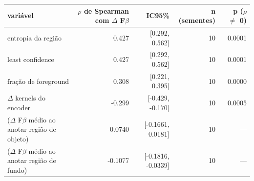 \begin{tabular}{lrrrr}
\hline
variável & $\rho$ de Spearman com $\Delta$ F$\beta$ & IC95\% & n (sementes) & p ($\rho$ $\neq$ 0) \\
\hline
entropia da região & 0.427 & [0.292, 0.562] & 10 & 0.0001 \\
least confidence & 0.427 & [0.292, 0.562] & 10 & 0.0001 \\
fração de foreground & 0.308 & [0.221, 0.395] & 10 & 0.0000 \\
$\Delta$ kernels do encoder & -0.299 & [-0.429, -0.170] & 10 & 0.0005 \\
($\Delta$ F$\beta$ médio ao anotar região de objeto) & -0.0740 & [-0.1661, 0.0181] & 10 & --- \\
($\Delta$ F$\beta$ médio ao anotar região de fundo) & -0.1077 & [-0.1816, -0.0339] & 10 & --- \\
\hline
\end{tabular}
